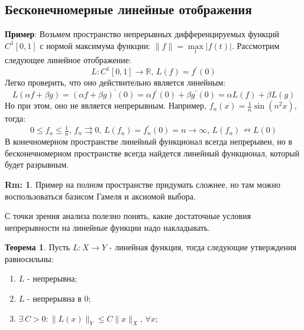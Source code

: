 \documentclass[12pt]{article}
\newcommand{\MR}{\mathbb{R}}
\theoremstyle{definition}
\newtheorem{rem}{Rm:}
\newtheorem{theorem}{Теорема}
\begin{document}
\subsection*{Бесконечномерные линейные отображения}
\textbf{Пример}: Возьмем пространство непрерывных дифференцируемых функций $C^1[0,1]$ с нормой максимума функции: $\|f\| = \max\limits_t |f(t)|$. Рассмотрим следующее линейное отображение: 
$$
	L\colon C^1[0,1] \to \MR,\, L(f) = f^\prime(0)
$$
Легко проверить, что оно действительно является линейным:
$$
	L(\alpha f + \beta g) = (\alpha f + \beta g)^\prime(0) = \alpha f^\prime(0) + \beta g^\prime(0) = \alpha L(f) + \beta L(g)
$$
Но при этом, оно не является непрерывным. Например, $f_n(x) = \frac{1}{n}\sin{(n^2x)}$, тогда:
$$
	0 \leq f_n \leq \tfrac{1}{n}, \, f_n \rightrightarrows 0, \, L(f_n) = f_n^\prime(0) = n \to \infty, \, L(f_n) \nrightarrow L(0)
$$
В конечномерном пространстве линейный функционал всегда непрерывен, но в бесконечномерном пространстве всегда найдется линейный функционал, который будет разрывным.
\begin{rem}
	Пример на полном пространстве придумать сложнее, но там можно воспользоваться базисом Гамеля и аксиомой выбора.
\end{rem}

С точки зрения анализа полезно понять, какие достаточные условия непрерывности на линейные функции надо накладывать. 

\begin{theorem}
	Пусть $L\colon X \to Y$ - линейная функция, тогда следующие утверждения равносильны:
	\begin{enumerate}[label ={(\arabic*)}]
		\item $L$ - непрерывна;
		\item $L$ - непрерывна в $0$;
		\item $\exists \, C > 0 \colon \|L(x)\|_Y \leq C \|x\|_X, \, \forall x$;
	\end{enumerate}
\end{theorem}
\end{document}
